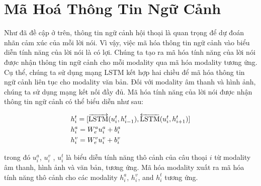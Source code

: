 \section{Mã Hoá Thông Tin Ngữ Cảnh} 

Như đã đề cập ở trên, thông tin ngữ cảnh hội thoại là quan trọng để dự đoán nhãn cảm xúc của mỗi lời nói. Vì vậy, việc mã hóa thông tin ngữ cảnh vào biểu diễn tính năng của lời nói là có lợi. Chúng ta tạo ra mã hóa tính năng của lời nói được nhận thông tin ngữ cảnh cho mỗi modality qua mã hóa modality tương ứng. Cụ thể, chúng ta sử dụng mạng LSTM kết hợp hai chiều để mã hóa thông tin ngữ cảnh liên tục cho modality văn bản. Đối với modality âm thanh và hình ảnh, chúng ta sử dụng mạng kết nối đầy đủ. Mã hóa tính năng của lời nói được nhận thông tin ngữ cảnh có thể biểu diễn như sau:

\begin{small}
\begin{equation}
\begin{aligned}
    \centering
    &h_{i}^t = [\overrightarrow{\mathrm{LSTM}}(u_{i}^t,h_{i-1}^t),\overleftarrow{\mathrm{LSTM}}(u_{i}^t,h_{i+1}^t)] \\
    &h_{i}^a = W_{e}^a u_{i}^a+b_{i}^a \\
    &h_{i}^v = W_{e}^v u_{i}^v+b_{i}^v
\end{aligned}
\end{equation}
\end{small}
trong đó $u_{i}^a$, $u_{i}^v$ , $u_{i}^t$  là biểu diễn tính năng thô cảnh của câu thoại $i$ từ modality âm thanh, hình ảnh và văn bản, tương ứng. Mã hóa modality xuất ra mã hóa tính năng thô cảnh cho các modality $h_{i}^a$, $h_{i}^v$, and $h_{i}^t$ tương ứng.




